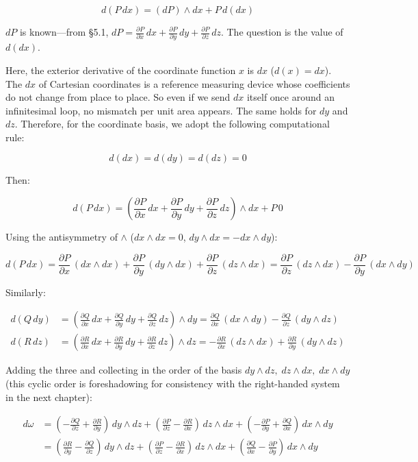 \documentclass[a4paper,12pt,openany]{book}
\begin{document}
\[d(P\,dx) = (dP) \wedge dx + P\,d(dx)\]

\(dP\) is known—from §5.1,
\(dP = \frac{\partial P}{\partial x}\,dx + \frac{\partial P}{\partial y}\,dy + \frac{\partial P}{\partial z}\,dz\).
The question is the value of \(d(dx)\).

Here, the exterior derivative of the coordinate function \(x\) is \(dx\)
(\(d(x) = dx\)). The \(dx\) of Cartesian coordinates is a reference
measuring device whose coefficients do not change from place to place.
So even if we send \(dx\) itself once around an infinitesimal loop, no
mismatch per unit area appears. The same holds for \(dy\) and \(dz\).
Therefore, for the coordinate basis, we adopt the following
computational rule:

\[d(dx) = d(dy) = d(dz) = 0\]

Then:

\[d(P\,dx) = (\frac{\partial P}{\partial x}\,dx + \frac{\partial P}{\partial y}\,dy + \frac{\partial P}{\partial z}\,dz) \wedge dx + P\,0\]

Using the antisymmetry of \(\wedge\) (\(dx \wedge dx = 0\),
\(dy \wedge dx = -dx \wedge dy\)):

\[d(P\,dx) = \frac{\partial P}{\partial x}\,(dx \wedge dx) + \frac{\partial P}{\partial y}\,(dy \wedge dx) + \frac{\partial P}{\partial z}\,(dz \wedge dx) = \frac{\partial P}{\partial z}\,(dz \wedge dx) - \frac{\partial P}{\partial y}\,(dx \wedge dy)\]

Similarly:

\[\begin{aligned}
d(Q\,dy) &= (\frac{\partial Q}{\partial x}\,dx + \frac{\partial Q}{\partial y}\,dy + \frac{\partial Q}{\partial z}\,dz) \wedge dy = \frac{\partial Q}{\partial x}\,(dx \wedge dy) - \frac{\partial Q}{\partial z}\,(dy \wedge dz) \\
d(R\,dz) &= (\frac{\partial R}{\partial x}\,dx + \frac{\partial R}{\partial y}\,dy + \frac{\partial R}{\partial z}\,dz) \wedge dz = -\frac{\partial R}{\partial x}\,(dz \wedge dx) + \frac{\partial R}{\partial y}\,(dy \wedge dz)
\end{aligned}\]

Adding the three and collecting in the order of the basis
\(dy \wedge dz,\; dz \wedge dx,\; dx \wedge dy\) (this cyclic order is
foreshadowing for consistency with the right-handed system in the next
chapter):

\[\begin{aligned}
d\omega &= (-\frac{\partial Q}{\partial z} + \frac{\partial R}{\partial y})\,dy \wedge dz + (\frac{\partial P}{\partial z} - \frac{\partial R}{\partial x})\,dz \wedge dx + (-\frac{\partial P}{\partial y} + \frac{\partial Q}{\partial x})\,dx \wedge dy \\
&= (\frac{\partial R}{\partial y} - \frac{\partial Q}{\partial z})\,dy \wedge dz + (\frac{\partial P}{\partial z} - \frac{\partial R}{\partial x})\,dz \wedge dx + (\frac{\partial Q}{\partial x} - \frac{\partial P}{\partial y})\,dx \wedge dy
\end{aligned}\]
\end{document}
